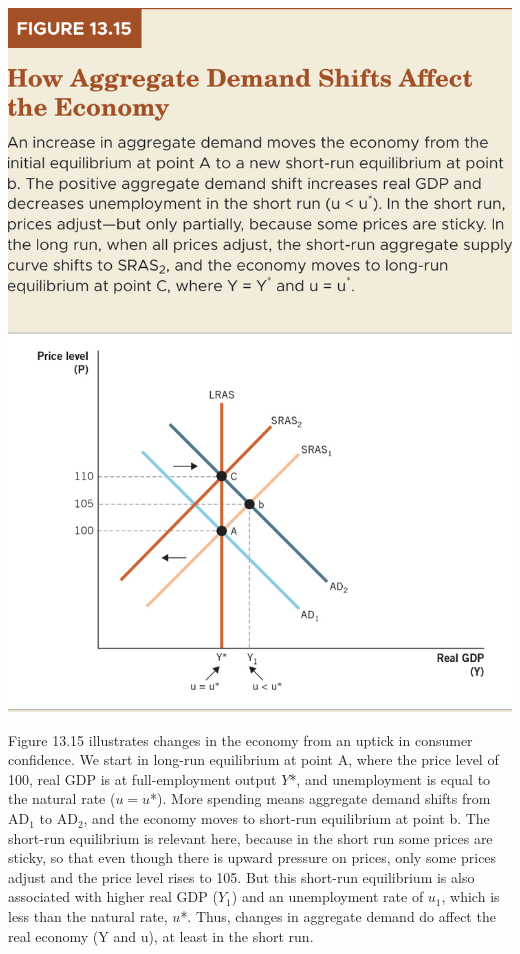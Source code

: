 \documentclass[11pt]{article} %
\begin{document}
\begin{center}
\includegraphics[scale=0.45]{images/Figure 13.15.png}
\end{center}

Figure 13.15 illustrates changes in the economy from an uptick in consumer confidence. We start in long-run equilibrium at point A, where the price level of 100, real GDP is at full-employment output \(Y\)*, and unemployment is equal to the natural rate (\(u = u\)*). More spending means aggregate demand shifts from \(\text{AD}_1\) to \(\text{AD}_2\), and the economy moves to short-run equilibrium at point b. The short-run equilibrium is relevant here, because in the short run some prices are sticky, so that even though there is upward pressure on prices, only some prices adjust and the price level rises to 105. But this short-run equilibrium is also associated with higher real GDP (\(Y_1\)) and an unemployment rate of \(u_1\), which is less than the natural rate, \(u\)*. Thus, changes in aggregate demand do affect the real economy (Y and u), at least in the short run.
\end{document}
